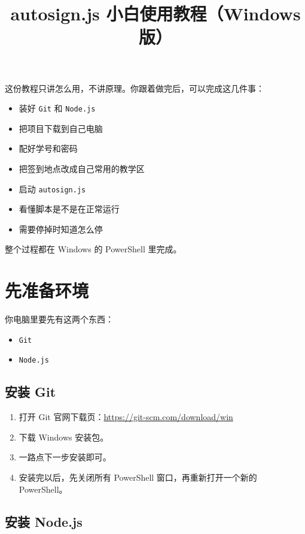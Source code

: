 \documentclass[UTF8,12pt]{ctexart}
\title{autosign.js 小白使用教程（Windows 版）}
\author{}
\date{}
\begin{document}
\maketitle

\noindent 这份教程只讲怎么用，不讲原理。你跟着做完后，可以完成这几件事：

\begin{itemize}
  \item 装好 \texttt{Git} 和 \texttt{Node.js}
  \item 把项目下载到自己电脑
  \item 配好学号和密码
  \item 把签到地点改成自己常用的教学区
  \item 启动 \texttt{autosign.js}
  \item 看懂脚本是不是在正常运行
  \item 需要停掉时知道怎么停
\end{itemize}

\noindent 整个过程都在 Windows 的 PowerShell 里完成。

\section{先准备环境}

\noindent 你电脑里要先有这两个东西：

\begin{itemize}
  \item \texttt{Git}
  \item \texttt{Node.js}
\end{itemize}

\subsection{安装 Git}

\begin{enumerate}
  \item 打开 Git 官网下载页：\url{https://git-scm.com/download/win}
  \item 下载 Windows 安装包。
  \item 一路点下一步安装即可。
  \item 安装完以后，先关闭所有 PowerShell 窗口，再重新打开一个新的 PowerShell。
\end{enumerate}

\subsection{安装 Node.js}
\end{document}
